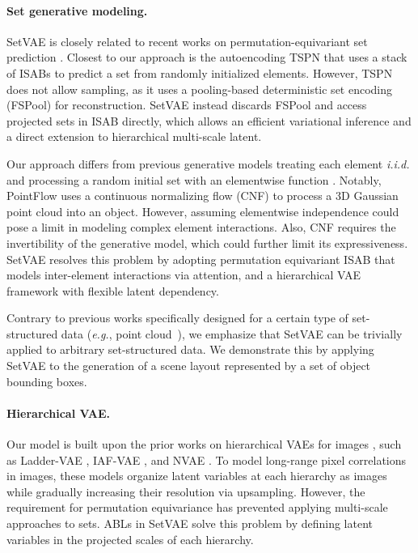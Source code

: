 \documentclass[final]{arxiv/cvpr}
\newcommand{\cutsectionup}{\vspace*{-0.15in}}
\newcommand{\cutparagraphup}{\vspace*{-0.1in}}
\begin{document}
\paragraph{Set generative modeling.} SetVAE is closely related to recent works on permutation-equivariant set prediction \cite{zhang2020deep, kosiorek2020conditional, carion2020endtoend, locatello2020objectcentric, li2020exchangeable}.
Closest to our approach is the autoencoding TSPN \cite{kosiorek2020conditional} that uses a stack of ISABs \cite{lee2019set} to predict a set from randomly initialized elements.
However, TSPN does not allow sampling, as it uses a pooling-based deterministic set encoding (FSPool) \cite{zhang2020fspool} for reconstruction.
SetVAE instead discards FSPool and access projected sets in ISAB directly, which allows an efficient variational inference and a direct extension to hierarchical multi-scale latent.

Our approach differs from previous generative models treating each element \emph{i.i.d.} and processing a random initial set with an elementwise function \cite{edwards2017neural, yang2019pointflow, kim2020softflow}.
Notably, PointFlow \cite{yang2019pointflow} uses a continuous normalizing flow (CNF) to process a 3D Gaussian point cloud into an object.
However, assuming elementwise independence could pose a limit in modeling complex element interactions.
Also, CNF requires the invertibility of the generative model, which could further limit its expressiveness.
SetVAE resolves this problem by adopting permutation equivariant ISAB that models inter-element interactions via attention, and a hierarchical VAE framework with flexible latent dependency.

Contrary to previous works specifically designed for a certain type of set-structured data (\emph{e.g.}, point cloud~\cite{achlioptas2018learning, li2018point, yang2019pointflow}), we emphasize that SetVAE can be trivially applied to arbitrary set-structured data. 
We demonstrate this by applying SetVAE to the generation of a scene layout represented by a set of object bounding boxes.



\cutparagraphup
\paragraph{Hierarchical VAE.}
Our model is built upon the prior works on hierarchical VAEs for images \cite{johnson2018structured}, such as Ladder-VAE \cite{sonderby2016ladder}, IAF-VAE \cite{kingma2017improving}, and NVAE \cite{vahdat2020nvae}.
To model long-range pixel correlations in images, these models organize latent variables at each hierarchy as images while gradually increasing their resolution via upsampling.
However, the requirement for permutation equivariance has prevented applying multi-scale approaches to sets.
ABLs in SetVAE solve this problem by defining latent variables in the projected scales of each hierarchy.
\\
\\
 \cutsectionup
\end{document}
